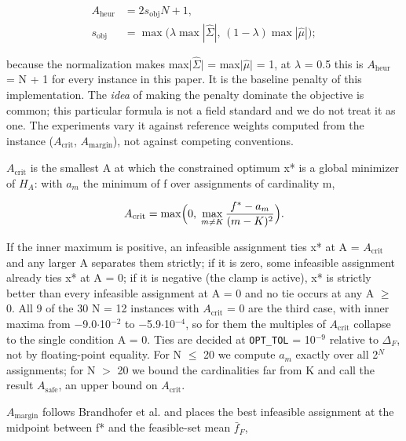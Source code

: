 \documentclass{ieeeaccess}
\begin{document}
\begin{equation*}
\begin{aligned} A_{\mathrm{heur}} &= 2 s_{\mathrm{obj}} N + 1,\\ s_{\mathrm{obj}} &= \max\bigl(\lambda \max|\hat{\Sigma}|,\, (1-\lambda)\max|\hat{\mu}|\bigr);\end{aligned}
\end{equation*}


because the normalization makes max$|$$\hat{\Sigma}$$|$ = max$|$$\hat{\mu}$$|$ = 1, at $\lambda$ = 0.5 this is $A_{\mathrm{heur}}$ = N + 1 for every instance in this paper. It is the baseline penalty of this implementation. The \textit{idea} of making the penalty dominate the objective is common; this particular formula is not a field standard and we do not treat it as one. The experiments vary it against reference weights computed from the instance ($A_{\mathrm{crit}}$, $A_{\mathrm{margin}}$), not against competing conventions.


$A_{\mathrm{crit}}$ is the smallest A at which the constrained optimum x* is a global minimizer of $H_{A}$: with $a_{m}$ the minimum of f over assignments of cardinality m,


\begin{equation*}
A_{\mathrm{crit}} = \max\Bigl(0,\; \max_{m \neq K} \frac{f^{*} - a_m}{(m-K)^2}\Bigr).
\end{equation*}


If the inner maximum is positive, an infeasible assignment ties x* at A = $A_{\mathrm{crit}}$ and any larger A separates them strictly; if it is zero, some infeasible assignment already ties x* at A = 0; if it is negative (the clamp is active), x* is strictly better than every infeasible assignment at A = 0 and no tie occurs at any A $\geq$ 0. All 9 of the 30 N = 12 instances with $A_{\mathrm{crit}}$ = 0 are the third case, with inner maxima from $-$9.0$\cdot$10$^{-2}$ to $-$5.9$\cdot$10$^{-4}$, so for them the multiples of $A_{\mathrm{crit}}$ collapse to the single condition A = 0. Ties are decided at \texttt{OPT\_TOL} = 10$^{-9}$ relative to $\Delta_{F}$, not by floating-point equality. For N $\leq$ 20 we compute $a_{m}$ exactly over all 2$^{N}$ assignments; for N $>$ 20 we bound the cardinalities far from K and call the result $A_{\mathrm{safe}}$, an upper bound on $A_{\mathrm{crit}}$.


$A_{\mathrm{margin}}$ follows Brandhofer et al. \cite{ref8} and places the best infeasible assignment at the midpoint between f* and the feasible-set mean $\bar{f}_{F}$,
\end{document}
